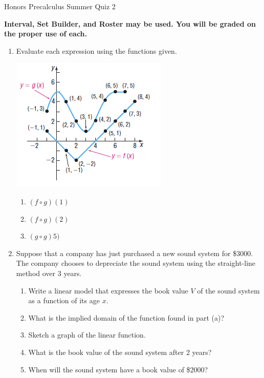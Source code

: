\documentclass{article}
\begin{document}
\begin{center}
\Large Honors Precalculus Summer Quiz 2
\end{center}

\textbf{Interval, Set Builder, and Roster may be used.  You will be graded on the proper use of each.}

\begin{enumerate}

			\item Evaluate each expression using the functions given.
		
			\includegraphics[width=.6\textwidth]{images/hw17}
			
			\begin{enumerate}
				\item $(f \circ g)(1)$
				\item $(f \circ g)(2)$
				\item $(g \circ g)5)$
			\end{enumerate}
								
		\item Suppose that a company has just purchased a new sound system for \$3000. The company chooses to depreciate the sound system using the straight-line method over 3 years.
		
			\begin{enumerate}
				\item Write a linear model that expresses the book value $V$ of
the sound system as a function of its age $x$.
				\item What is the implied domain of the function found in part (a)?
				\item Sketch a graph of the linear function.
				\item What is the book value of the sound system after 2 years?
				\item When will the sound system have a book value of \$2000?
			\end{enumerate}
						
\end{enumerate}
\end{document}
